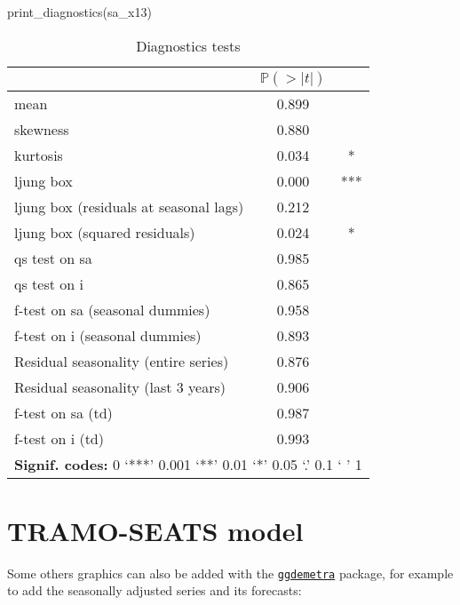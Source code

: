 \documentclass[
]{article}
\newenvironment{Shaded}{\begin{snugshade}}{\end{snugshade}}
\newcommand{\FunctionTok}[1]{\textcolor[rgb]{0.00,0.00,0.00}{#1}}
\newcommand{\NormalTok}[1]{#1}
\begin{document}
\begin{Shaded}
\begin{Highlighting}[]
\FunctionTok{print\_diagnostics}\NormalTok{(sa\_x13)}
\end{Highlighting}
\end{Shaded}

\begin{table}[H]
\centering
\caption{\label{tab:unnamed-chunk-3}Diagnostics tests}
\centering
\begin{tabular}[t]{l|c|c}
\hline
  & $\mathbb P (> \lvert t \rvert)$ & \\
\hline
mean & 0.899 & \\
\hline
skewness & 0.880 & \\
\hline
kurtosis & 0.034 & *\\
\hline
ljung box & 0.000 & ***\\
\hline
ljung box (residuals at seasonal lags) & 0.212 & \\
\hline
ljung box (squared residuals) & 0.024 & *\\
\hline
qs test on sa & 0.985 & \\
\hline
qs test on i & 0.865 & \\
\hline
f-test on sa (seasonal dummies) & 0.958 & \\
\hline
f-test on i (seasonal dummies) & 0.893 & \\
\hline
Residual seasonality (entire series) & 0.876 & \\
\hline
Residual seasonality (last 3 years) & 0.906 & \\
\hline
f-test on sa (td) & 0.987 & \\
\hline
f-test on i (td) & 0.993 & \\
\hline
\multicolumn{3}{l}{\rule{0pt}{1em}\textbf{Signif. codes: }0 `***' 0.001 `**' 0.01 `*' 0.05 `.' 0.1 ` ' 1}\\
\end{tabular}
\end{table}

\hypertarget{tramo-seats-model}{%
\section{TRAMO-SEATS model}\label{tramo-seats-model}}

Some others graphics can also be added with the
\href{https://aqlt.github.io/ggdemetra/}{\texttt{ggdemetra}} package,
for example to add the seasonally adjusted series and its forecasts:
\end{document}
